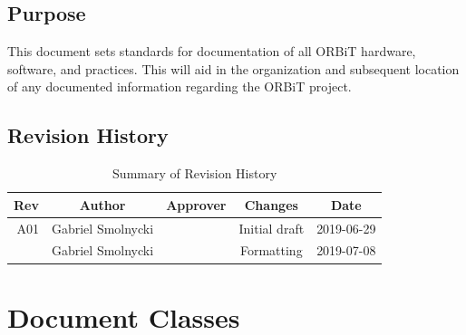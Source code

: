 \documentclass[12pt,article]{memoir}
\begin{document}
\section{Purpose}
This document sets standards for documentation of all ORBiT hardware, software, and practices. This will aid in the organization and subsequent location of any documented information regarding the ORBiT project.

\section{Revision History}
\begin{table}[H]
	\centering
	\begin{tabu}{r || c | c | c | c }
		Rev & Author & Approver & Changes & Date\\ \hline
		A01 & Gabriel Smolnycki & & Initial draft & 2019-06-29 \\
		& Gabriel Smolnycki & & Formatting & 2019-07-08 \\
	\end{tabu}
	\caption{Summary of Revision History}
	\label{tab:rev}
\end{table}

\newpage

\chapter{Document Classes}
\end{document}
